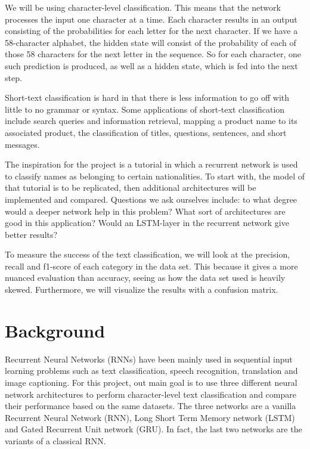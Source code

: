 \documentclass[runningheads]{llncs}
\begin{document}
We will be using character-level classification. This means that the network processes the input one character at a time. Each character results in an output consisting of the probabilities for each letter for the next character. If we have a 58-character alphabet, the hidden state will consist of the probability of each of those 58 characters for the next letter in the sequence. So for each character, one such prediction is produced, as well as a hidden state, which is fed into the next step.

Short-text classification is hard in that there is less information to go off with little to no grammar or syntax. Some applications of short-text classification include search queries and information retrieval, mapping a product name to its associated product, the classification of titles, questions, sentences, and short messages.

The inspiration for the project is a tutorial in which a recurrent network is used to classify names as belonging to certain nationalities. To start with, the model of that tutorial is to be replicated, then additional architectures will be implemented and compared. Questions we ask ourselves include: to what degree would a deeper network help in this problem? What sort of architectures are good in this application? Would an LSTM-layer in the recurrent network give better results? 

To measure the success of the text classification, we will look at the precision, recall and f1-score of each category in the data set. This because it gives a more nuanced evaluation than accuracy, seeing as how the data set used is heavily skewed. Furthermore, we will visualize the results with a confusion matrix.


\section{Background}


Recurrent Neural Networks (RNNs) have been mainly used in sequential input learning problems such as text classification, speech recognition, translation and image captioning. For this project, out main goal is to use three different neural network architectures to perform character-level text classification and compare their performance based on the same datasets. The three networks are a vanilla Recurrent Neural Network (RNN), Long Short Term Memory network (LSTM) and Gated Recurrent Unit network (GRU). In fact, the last two networks are the variants of a classical RNN. 
\end{document}
